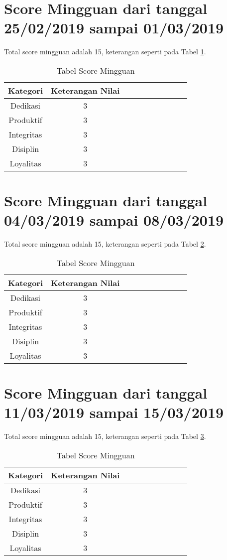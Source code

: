 \section{Score Mingguan dari tanggal 25/02/2019 sampai 01/03/2019}
Total score mingguan adalah 15, keterangan seperti pada Tabel \ref{table:scoremingguan}.
\begin{table}[!ht]
\centering
\begin{tabular}{ |c|c|c|c|c|c|c|c|c|c| }
\hline
Kategori & Keterangan Nilai \\
\hline
Dedikasi & 3 \\
\hline
Produktif & 3 \\
\hline
Integritas & 3 \\
\hline
Disiplin & 3 \\
\hline
Loyalitas & 3 \\
\hline
\end{tabular}
\caption{Tabel Score Mingguan}
\label{table:scoremingguan}
\end{table}

\section{Score Mingguan dari tanggal 04/03/2019 sampai 08/03/2019}
Total score mingguan adalah 15,  keterangan seperti pada Tabel \ref{table:scoremingguan2}.
\begin{table}[!ht]
\centering
\begin{tabular}{ |c|c|c|c|c|c|c|c|c|c| }
\hline
Kategori & Keterangan Nilai \\
\hline
Dedikasi & 3 \\
\hline
Produktif & 3 \\
\hline
Integritas & 3 \\
\hline
Disiplin & 3 \\
\hline
Loyalitas & 3 \\
\hline
\end{tabular}
\caption{Tabel Score Mingguan}
\label{table:scoremingguan2}
\end{table}




\section{Score Mingguan dari tanggal 11/03/2019 sampai 15/03/2019}
Total score mingguan adalah 15,  keterangan seperti pada Tabel \ref{table:scoremingguan3}.
\begin{table}[!ht]
\centering
\begin{tabular}{ |c|c|c|c|c|c|c|c|c|c| }
\hline
Kategori & Keterangan Nilai \\
\hline
Dedikasi & 3 \\
\hline
Produktif & 3 \\
\hline
Integritas & 3 \\
\hline
Disiplin & 3 \\
\hline
Loyalitas & 3 \\
\hline
\end{tabular}
\caption{Tabel Score Mingguan}
\label{table:scoremingguan3}
\end{table}


